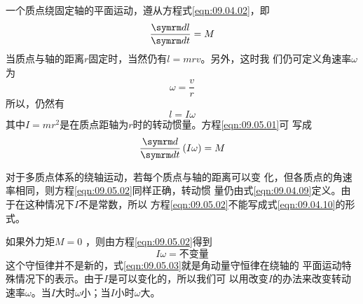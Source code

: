 \section[转动动能]{}\label{sec:09.05}

一个质点绕固定轴的平面运动，遵从方程式\eqref{eqn:09.04.02}，即
\begin{equation}\label{eqn:09.05.01}
  \frac { \dif l } { \dif t } = M
\end{equation}
当质点与轴的距离$ r $固定时，当然仍有$ l = m r v $。另外，这时我
们仍可定义角速率$ \omega $为
\begin{equation*}
  \omega = \frac { v } { r }
\end{equation*}
所以，仍然有
\begin{equation*}
  l = I \omega
\end{equation*}
其中$ I = m r ^ { 2 } $是在质点距轴为$ r $时的转动惯量。方程\eqref{eqn:09.05.01}可
写成
\begin{equation}\label{eqn:09.05.02}
  \frac { \dif } { \dif t } \left( I \omega \right) = M
\end{equation}

对于多质点体系的绕轴运动，若每个质点与轴的距离可以变
化，但各质点的角速率相同，则方程\eqref{eqn:09.05.02}同样正确，转动惯
量仍由式\eqref{eqn:09.04.09}定义。由于在这种情况下$ I $不是常数，所以
方程\eqref{eqn:09.05.02}不能写成式\eqref{eqn:09.04.10}的形式。

如果外力矩$ M = 0 $ ，则由方程\eqref{eqn:09.05.02}得到
\begin{equation}\label{eqn:09.05.03}
  I \omega = \text{不变量}
\end{equation}
这个守恒律并不是新的，式\eqref{eqn:09.05.03}就是角动量守恒律在绕轴的
平面运动特殊情况下的表示。由于$ I $是可以变化的，所以我们可
以用改变$ I $的办法来改变转动速率$ \omega $。当$ I $大时$ \omega $小；当$ I $小时$ \omega $大。

